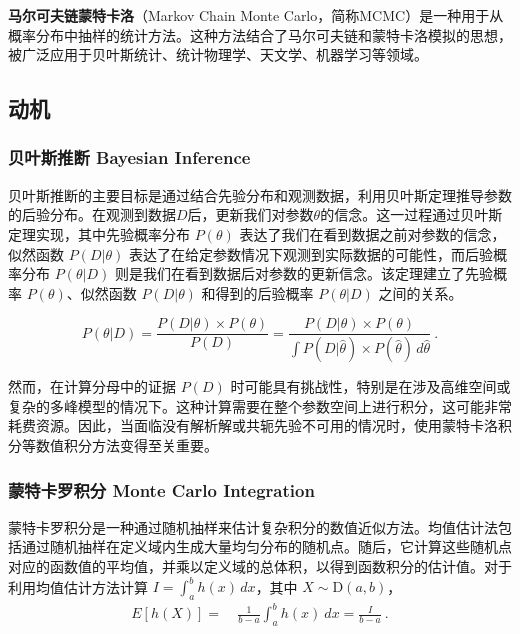
\textbf{马尔可夫链蒙特卡洛}（Markov Chain Monte Carlo，简称MCMC）是一种用于从概率分布中抽样的统计方法。这种方法结合了马尔可夫链和蒙特卡洛模拟的思想，被广泛应用于贝叶斯统计、统计物理学、天文学、机器学习等领域。

\subsection{动机}
\subsubsection{贝叶斯推断 Bayesian Inference}

贝叶斯推断的主要目标是通过结合先验分布和观测数据，利用贝叶斯定理推导参数的后验分布。在观测到数据\(D\)后，更新我们对参数\(\theta\)的信念。这一过程通过贝叶斯定理实现，其中先验概率分布 \(P(\theta)\) 表达了我们在看到数据之前对参数的信念，似然函数 \(P(D|\theta)\) 表达了在给定参数情况下观测到实际数据的可能性，而后验概率分布 \(P(\theta|D)\) 则是我们在看到数据后对参数的更新信念。该定理建立了先验概率 \(P(\theta)\)、似然函数 \(P(D|\theta)\) 和得到的后验概率 \(P(\theta|D)\) 之间的关系。

\begin{equation}
P(\theta|D) = \frac{P(D|\theta) \times P(\theta)}{P(D)} = \frac{P(D|\theta) \times P(\theta)}{\int P(D|\hat{\theta}) \times P(\hat{\theta}) \, d\hat{\theta}}~.
\end{equation}

然而，在计算分母中的证据 \(P(D)\) 时可能具有挑战性，特别是在涉及高维空间或复杂的多峰模型的情况下。这种计算需要在整个参数空间上进行积分，这可能非常耗费资源。因此，当面临没有解析解或共轭先验不可用的情况时，使用蒙特卡洛积分等数值积分方法变得至关重要。

\subsubsection{蒙特卡罗积分 Monte Carlo Integration}

蒙特卡罗积分是一种通过随机抽样来估计复杂积分的数值近似方法。均值估计法包括通过随机抽样在定义域内生成大量均匀分布的随机点。随后，它计算这些随机点对应的函数值的平均值，并乘以定义域的总体积，以得到函数积分的估计值。对于利用均值估计方法计算 \(I = \int_a^b h(x) \,dx\)，其中 \(X \sim \text{D}(a,b)\)，
\begin{align} 
E [h(X)] =& \  \frac{1}{b-a} \int_a^b h(x) \ dx = \frac{I}{b-a}~.
\end{align}

